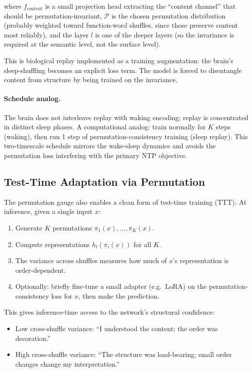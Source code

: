 \documentclass[11pt, a4paper]{article}
\theoremstyle{plain}
\theoremstyle{definition}
\theoremstyle{remark}
\begin{document}
where $f_{\text{content}}$ is a small projection head extracting the ``content channel'' that should be permutation-invariant, $\mathcal{P}$ is the chosen permutation distribution (probably weighted toward function-word shuffles, since those preserve content most reliably), and the layer $l$ is one of the deeper layers (so the invariance is required at the semantic level, not the surface level).

This is biological replay implemented as a training augmentation: the brain's sleep-shuffling becomes an explicit loss term.
The model is forced to disentangle content from structure by being trained on the invariance.

\paragraph{Schedule analog.}
The brain does not interleave replay with waking encoding; replay is concentrated in distinct sleep phases.
A computational analog: train normally for $K$ steps (waking), then run 1 step of permutation-consistency training (sleep replay).
This two-timescale schedule mirrors the wake-sleep dynamics and avoids the permutation loss interfering with the primary NTP objective.

\subsection{Test-Time Adaptation via Permutation}

The permutation gauge also enables a clean form of test-time training (TTT).
At inference, given a single input $x$:
\begin{enumerate}[nosep]
\item Generate $K$ permutations $\pi_1(x), \ldots, \pi_K(x)$.
\item Compute representations $h_l(\pi_i(x))$ for all $K$.
\item The variance across shuffles measures how much of $x$'s representation is order-dependent.
\item Optionally: briefly fine-tune a small adapter (e.g.\ LoRA) on the permutation-consistency loss for $x$, then make the prediction.
\end{enumerate}

This gives inference-time access to the network's structural confidence:
\begin{itemize}[nosep]
\item Low cross-shuffle variance: ``I understood the content; the order was decoration.''
\item High cross-shuffle variance: ``The structure was load-bearing; small order changes change my interpretation.''
\end{itemize}
\end{document}
